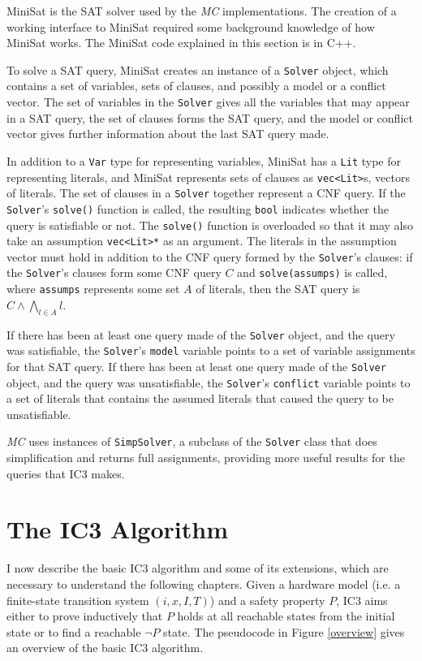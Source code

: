 \documentclass[12pt,a4paper,twoside,openright]{report}
\begin{document}
{MiniSat is the SAT solver used by the \emph{MC} implementations. The creation of a
working interface to MiniSat required some background knowledge of how MiniSat
works. The MiniSat code explained in this section is in C++.

To solve a SAT query, MiniSat creates an instance of a \verb,Solver, object,
which contains a set of variables, sets of clauses, and possibly a model or a conflict vector.
The set of variables in the \verb,Solver, gives all the variables that may appear in
a SAT query, the set of clauses forms the SAT query, and the model or conflict vector
gives further information about the last SAT query made.

In addition to a \verb,Var, type for representing variables, MiniSat has a \verb,Lit, type for
representing literals, and MiniSat represents sets of clauses as \verb,vec<Lit>,s,
vectors of literals. The set of clauses in a \verb,Solver, together represent a CNF query.
If the \verb,Solver,'s \verb,solve(), function is called,
the resulting \verb,bool, indicates whether the query is satisfiable or not. The
\verb,solve(), function is overloaded so that it may also take an assumption \verb,vec<Lit>*, as
an argument. The literals in the assumption vector must hold in addition to the CNF query formed
by the \verb,Solver,'s clauses: if the \verb,Solver,'s clauses form some CNF query $C$ and
\verb,solve(assumps), is called, where \verb,assumps, represents some set $A$ of literals,
then the SAT query is $C \wedge \bigwedge_{l \in A} l$.

If there has been at least one query made of the \verb,Solver, object, and the query was
satisfiable, the \verb,Solver,'s \verb,model, variable points to a set of variable assignments
for that SAT query.
If there has been at least one query made of the \verb,Solver, object, and the query was
unsatisfiable, the \verb,Solver,'s \verb,conflict, variable points to a set of literals that
contains the assumed literals that caused the query to be unsatisfiable.

\emph{MC} uses instances of \verb,SimpSolver,, a subclass of the \verb,Solver, class
that does simplification and returns full assignments, providing more useful results
for the queries that IC3 makes.

\section{The IC3 Algorithm}
\label{prep:ic3}
I now describe the basic IC3 algorithm and some of its extensions, which are
necessary to understand the following chapters.
Given a hardware model (i.e. a finite-state transition system $(i,x,I,T)$) and a
safety property $P$, IC3 aims either to prove inductively that $P$ holds
at all reachable states from the initial state or
to find a reachable $\neg P$ state.
The pseudocode in Figure \ref{overview} gives an overview of the basic IC3 algorithm.	

}
\end{document}
